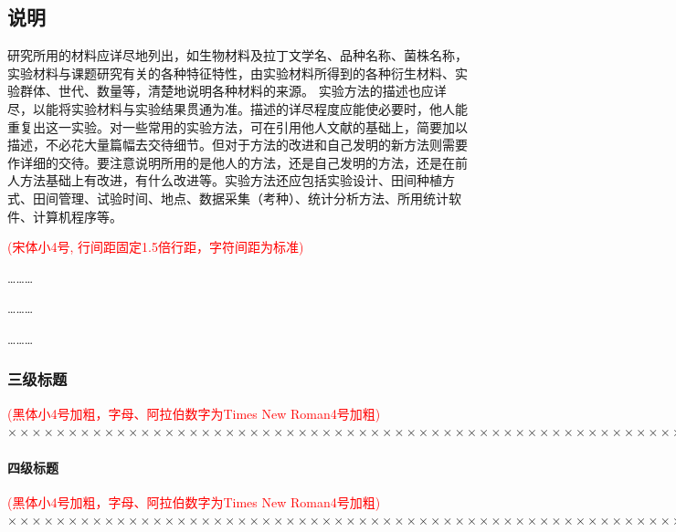 \documentclass[a4paper]{article}
\newcommand{\kai}{\CJKfamily{kai}}
\newcommand{\wuhao}{\fontsize{10.5pt}{18pt}\selectfont}
\theoremstyle{definition}
\theoremstyle{plain}
\theoremstyle{remark}
\newcommand{\hongzifuzhu}[1]{\textcolor{red}{\kai \wuhao(#1)}}
\begin{document}
\subsection{说明}

研究所用的材料应详尽地列出，如生物材料及拉丁文学名、品种名称、菌株名称，实验材料与课题研究有关的各种特征特性，由实验材料所得到的各种衍生材料、实验群体、世代、数量等，清楚地说明各种材料的来源。
实验方法的描述也应详尽，以能将实验材料与实验结果贯通为准。描述的详尽程度应能使必要时，他人能重复出这一实验。对一些常用的实验方法，可在引用他人文献的基础上，简要加以描述，不必花大量篇幅去交待细节。但对于方法的改进和自己发明的新方法则需要作详细的交待。要注意说明所用的是他人的方法，还是自己发明的方法，还是在前人方法基础上有改进，有什么改进等。实验方法还应包括实验设计、田间种植方式、田间管理、试验时间、地点、数据采集（考种）、统计分析方法、所用统计软件、计算机程序等。

\hongzifuzhu{宋体小4号, 行间距固定1.5倍行距，字符间距为标准}

\hspace{15em} \ldots\ldots\ldots

\hspace{15em} \ldots\ldots\ldots

\hspace{15em} \ldots\ldots\ldots

\subsubsection{三级标题}
\hongzifuzhu{黑体小4号加粗，字母、阿拉伯数字为Times New Roman4号加粗}
$ \times\times\times\times\times\times\times\times\times\times\times\times\times\times\times\times\times\times\times\times\times\times\times\times\times\times\times\times\times\times\times\times\times\times\times\times\times\times\times\times\times\times\times\times\times\times\times\times\times\times\times\times\times\times\times\times\times\times\times\times\times\times\times\times\times\times\times\times\times\times\times\times\times\times\times\times\times\times\times\times\times\times\times\times\times\times\times\times\times\times\times\times\times\times\times\times\times\times\times\times $
\paragraph{四级标题}
\hongzifuzhu{黑体小4号加粗，字母、阿拉伯数字为Times New Roman4号加粗}
$ \times\times\times\times\times\times\times\times\times\times\times\times\times\times\times\times\times\times\times\times\times\times\times\times\times\times\times\times\times\times\times\times\times\times\times\times\times\times\times\times\times\times\times\times\times\times\times\times\times\times\times\times\times\times\times\times\times\times\times\times\times\times\times\times\times\times\times\times\times\times\times\times\times\times\times\times\times\times\times\times\times\times\times\times\times\times\times\times\times\times\times\times\times\times\times\times\times\times\times\times $
\end{document}
